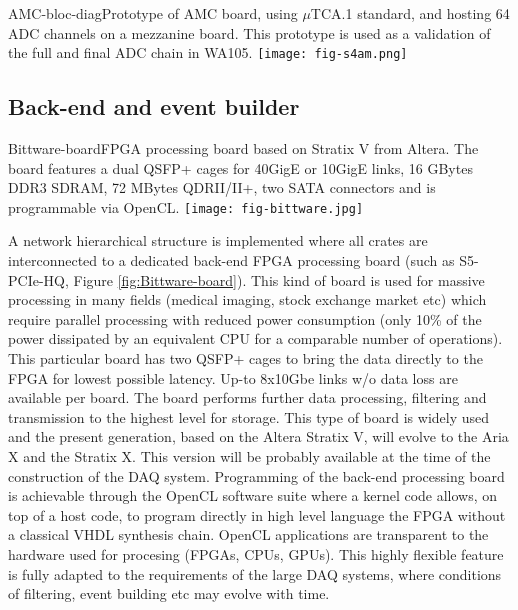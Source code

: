 \begin{cdrfigure}{AMC-bloc-diag}{\small Prototype of AMC board, using $\mu$TCA.1 standard, and hosting 64 ADC channels on a mezzanine board. This prototype is used as a validation of the full and final ADC chain in WA105.}
\texttt{[image: fig-s4am.png]}
\end{cdrfigure}

\subsection{Back-end and event builder}

\begin{cdrfigure}{Bittware-board}{\small FPGA processing board based on Stratix V from Altera. The board features a dual QSFP+ cages for 40GigE or 10GigE links, 16 GBytes DDR3 SDRAM, 72 MBytes QDRII/II+, two SATA connectors and is programmable via OpenCL.}
\texttt{[image: fig-bittware.jpg]}
\end{cdrfigure}

A network hierarchical structure is implemented where all crates are interconnected to a dedicated back-end FPGA processing board (such as S5-PCIe-HQ, Figure \ref{fig:Bittware-board}). This kind of board is used for massive processing in many fields (medical imaging, stock exchange market etc) which require parallel processing with reduced power consumption (only 10\% of the power dissipated by an equivalent CPU for a comparable number of operations). This particular board has two QSFP+ cages to bring the data directly to the FPGA for lowest possible latency. Up-to 8x10Gbe links w/o data loss are available per board.  The board performs further data processing, filtering and transmission to the highest level for storage. This type of board is widely used and the present generation, based on the Altera Stratix V, will evolve to the Aria X and the Stratix X. This version will be probably available at the time of the construction of the DAQ system. Programming of the back-end processing board is achievable through the OpenCL software suite where a kernel code allows, on top of a host code, to program directly in high level language the FPGA without a classical VHDL synthesis chain. OpenCL applications are transparent to the hardware used for procesing (FPGAs, CPUs, GPUs). This highly flexible feature is fully adapted to the requirements of the large DAQ systems, where conditions of filtering, event building etc may evolve with time.
 
